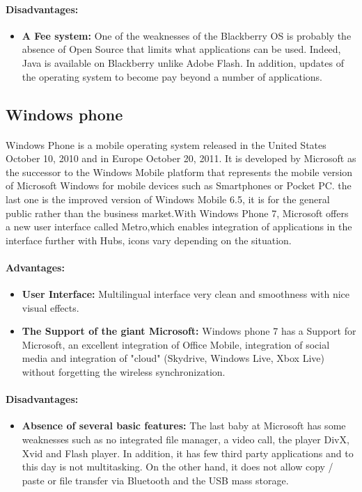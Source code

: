 \paragraph{Disadvantages:}
\begin{itemize}
 \item \textbf{A Fee system: }One of the weaknesses of the Blackberry OS is probably the absence of Open Source that limits what applications can be used.
Indeed, Java is available on Blackberry unlike Adobe Flash. In addition, updates of the operating system to become pay beyond a number of applications.
\end{itemize}
\subsection{Windows phone}
\paragraph{}
Windows Phone is a mobile operating system released in the United States October 10, 2010 and in Europe October 20, 2011. 
It is developed by Microsoft as the successor 
to the Windows Mobile platform that represents the mobile version of Microsoft Windows for mobile devices such as Smartphones or Pocket PC.
the last one is the improved version of Windows Mobile 6.5, it is for the general public rather than the business market.With Windows Phone 7, 
Microsoft offers a new user interface called Metro,which enables integration of applications in the interface further with
Hubs, icons vary depending on the situation.
\paragraph{Advantages:}
\begin{itemize}
 \item \textbf{User Interface: }Multilingual interface very clean and smoothness with nice visual effects.
 \item \textbf{The Support of the giant Microsoft: }Windows phone 7 has a Support for Microsoft, an excellent integration of Office Mobile, integration of social media and integration of "cloud" (Skydrive, Windows Live, Xbox Live) without forgetting the wireless synchronization.
\end{itemize}

\paragraph{Disadvantages: }
\begin{itemize}
 \item \textbf{Absence of several basic features: }The last baby at Microsoft has some weaknesses such as no integrated file manager, a video call, the player DivX, Xvid and Flash player. In addition, it has few third party applications and to this day is not multitasking. On the other hand, it does not allow copy / paste or file transfer via Bluetooth and the USB mass storage.
\end{itemize}


